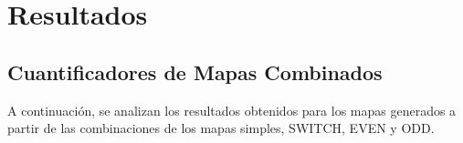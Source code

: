 \section{Resultados}
\label{secResultadosSwitchign}




 

\subsection{Cuantificadores de Mapas Combinados}\label{subsec:SecSwitch}
A continuación, se analizan los resultados obtenidos para los mapas generados a partir de las combinaciones de los mapas simples, SWITCH, EVEN y ODD.

